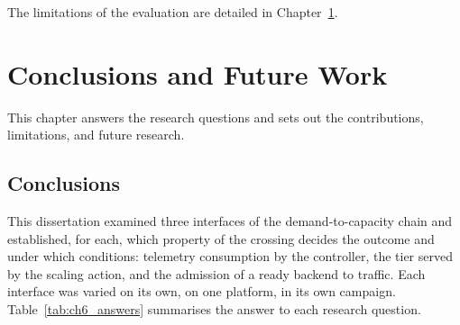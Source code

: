 ﻿\documentclass[12pt,reqno,twoside]{amsbook}
\begin{document}
The limitations of the evaluation are detailed in
Chapter~\ref{ch:conclusions}.


\chapter{Conclusions and Future Work}\label{ch:conclusions}
This chapter answers the research questions and sets out the contributions,
limitations, and future research.

\section{Conclusions}\label{sec:conclusions}
This dissertation examined three interfaces of the demand-to-capacity chain
and established, for each, which property of the crossing decides the
outcome and under which conditions: telemetry consumption by the controller,
the tier served by the scaling action, and the admission of a ready backend
to traffic. Each interface was varied on its own, on one platform, in its own
campaign. Table~\ref{tab:ch6_answers} summarises the answer to each research
question.
\end{document}
